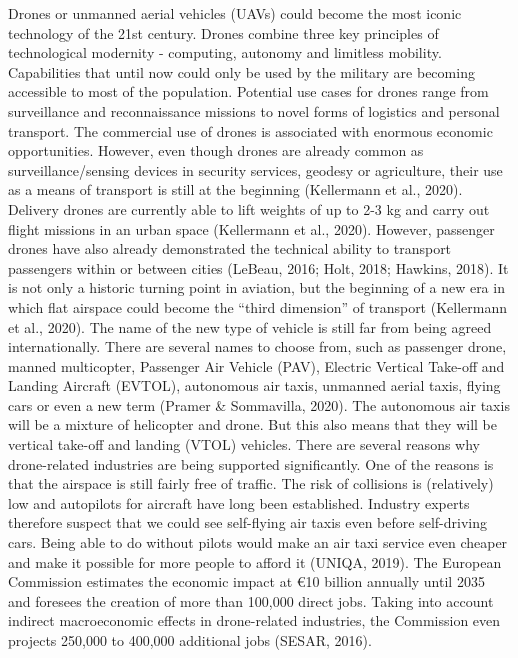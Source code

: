\documentclass[
]{book}
\begin{document}
Drones or unmanned aerial vehicles (UAVs) could become the most iconic technology of the 21st century. Drones combine three key principles of technological modernity - computing, autonomy and limitless mobility. Capabilities that until now could only be used by the military are becoming accessible to most of the population. Potential use cases for drones range from surveillance and reconnaissance missions to novel forms of logistics and personal transport. The commercial use of drones is associated with enormous economic opportunities. However, even though drones are already common as surveillance/sensing devices in security services, geodesy or agriculture, their use as a means of transport is still at the beginning (Kellermann et al., 2020).
Delivery drones are currently able to lift weights of up to 2-3 kg and carry out flight missions in an urban space (Kellermann et al., 2020). However, passenger drones have also already demonstrated the technical ability to transport passengers within or between cities (LeBeau, 2016; Holt, 2018; Hawkins, 2018). It is not only a historic turning point in aviation, but the beginning of a new era in which flat airspace could become the ``third dimension'' of transport (Kellermann et al., 2020).
The name of the new type of vehicle is still far from being agreed internationally. There are several names to choose from, such as passenger drone, manned multicopter, Passenger Air Vehicle (PAV), Electric Vertical Take-off and Landing Aircraft (EVTOL), autonomous air taxis, unmanned aerial taxis, flying cars or even a new term (Pramer \& Sommavilla, 2020).
The autonomous air taxis will be a mixture of helicopter and drone. But this also means that they will be vertical take-off and landing (VTOL) vehicles.
There are several reasons why drone-related industries are being supported significantly. One of the reasons is that the airspace is still fairly free of traffic. The risk of collisions is (relatively) low and autopilots for aircraft have long been established. Industry experts therefore suspect that we could see self-flying air taxis even before self-driving cars. Being able to do without pilots would make an air taxi service even cheaper and make it possible for more people to afford it (UNIQA, 2019).
The European Commission estimates the economic impact at €10 billion annually until 2035 and foresees the creation of more than 100,000 direct jobs. Taking into account indirect macroeconomic effects in drone-related industries, the Commission even projects 250,000 to 400,000 additional jobs (SESAR, 2016).
\end{document}
